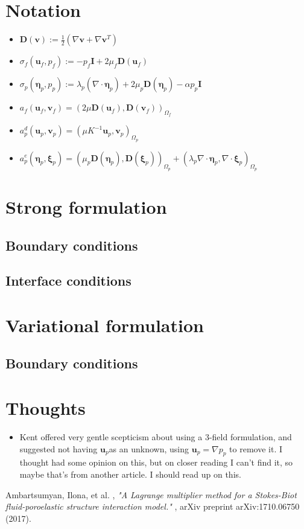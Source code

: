\documentclass{article}
\newcommand{\D}{\ensuremath{\mathbf{D}}}
\newcommand{\grad}{\ensuremath{\nabla}}
\renewcommand{\div}{\ensuremath{\nabla \cdot}}
\newcommand{\inner}[2]{\ensuremath{(#1, #2)}}
\newcommand{\defeq}{\ensuremath{:=}}
\newcommand{\stokes}{\ensuremath{\Omega_{f}}}
\newcommand{\darcy}{\ensuremath{\Omega_{p}}}
\newcommand{\uf}{\ensuremath{\mathbf{u}_f}}
\newcommand{\vf}{\ensuremath{\mathbf{v}_f}}
\newcommand{\up}{\ensuremath{\mathbf{u}_p}}
\newcommand{\vp}{\ensuremath{\mathbf{v}_p}}
\newcommand{\pf}{\ensuremath{p_f}}
\newcommand{\pp}{\ensuremath{p_p}}
\newcommand{\disp}{\ensuremath{\boldsymbol{\eta}_p}}
\newcommand{\disptest}{\ensuremath{\boldsymbol{\xi}_p}}
\begin{document}
\section{Notation}
\begin{itemize}
\item $\D(\mathbf{v}) \defeq \frac 12 (\grad \mathbf{v} + \grad \mathbf{v}^T)$
\item $\sigma_f(\uf, \pf) \defeq -\pf \mathbf{I} + 2 \mu_f \D(\uf)$
\item $\sigma_p(\disp, \pp) \defeq \lambda_p (\div \disp) + 2 \mu_p \D(\disp) - \alpha \pp \mathbf{I} $
  
\item $a_f(\uf, \vf) = \inner{2\mu \D(\uf)} {\D(\vf)}_{\stokes}$
\item $a_p^d(\up, \vp) = \inner{\mu K^{-1}\up} {\vp}_{\darcy}$
\item $a_p^e(\disp, \disptest) = \inner{\mu_p \D(\disp)} {\D(\disptest)}_{\darcy} + \inner{\lambda_p \div \disp} {\div \disptest}_{\darcy}$
  
\end{itemize}

\section{Strong formulation}
\subsection{Boundary conditions}
\subsection{Interface conditions}

\section{Variational formulation}
\subsection{Boundary conditions}






\section{Thoughts}
\begin{itemize}
\item Kent offered very gentle scepticism about using a 3-field formulation, and suggested not having \up as an unknown, using $\up = \grad \pp$ to remove it. I thought \cite{ambartsumyan} had some opinion on this, but on closer reading I can't find it, so maybe that's from another article. I should read up on this.
 
\end{itemize}


\begin{thebibliography}{99}
{\sc Ambartsumyan, Ilona, et al. }, {\em "A Lagrange multiplier method for a Stokes-Biot fluid-poroelastic structure interaction model." }, arXiv preprint arXiv:1710.06750 (2017).
  
\end{thebibliography}
\end{document}
